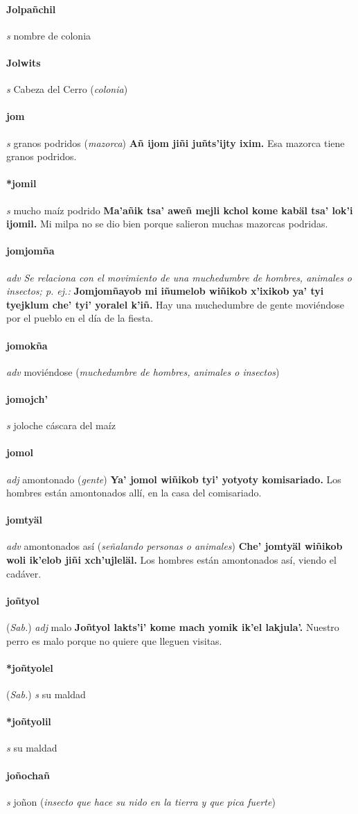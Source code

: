 \documentclass{scrbook}
\newcommand{\entry}[1]{\paragraph{#1}}
\newcommand{\nontranslationdef}[1]{\textit{#1}}
\newcommand{\partofspeech}[1]{\textit{#1}}
\newcommand{\spanishtranslation}[1]{#1}
\newcommand{\clarification}[1]{(\textit{#1})}
\newcommand{\cholexample}[1]{\textbf{#1}}
\newcommand{\exampletranslation}[1]{#1}
\newcommand{\relevantdialect}[1]{(\textit{#1})}
\begin{document}
\begin{multicols}{2}
\entry{Jolpañchil}
\partofspeech{s}
\spanishtranslation{nombre de colonia}

\entry{Jolwits}
\partofspeech{s}
\spanishtranslation{Cabeza del Cerro}
\clarification{colonia}

\entry{jom}
\partofspeech{s}
\spanishtranslation{granos podridos}
\clarification{mazorca}
\cholexample{Añ ijom jiñi juñts'ijty ixim.}
\exampletranslation{Esa mazorca tiene granos podridos.}

\entry{*jomil}
\partofspeech{s}
\spanishtranslation{mucho maíz podrido}
\cholexample{Ma'añik tsa' aweñ mejli kchol kome kabäl tsa' lok'i ijomil.}
\exampletranslation{Mi milpa no se dio bien porque salieron muchas mazorcas podridas.}

\entry{jomjomña}
\partofspeech{adv}
\nontranslationdef{Se relaciona con el movimiento de una muchedumbre de hombres, animales o insectos; p. ej.:}
\cholexample{Jomjomñayob mi iñumelob wiñikob x'ixikob ya' tyi tyejklum che' tyi' yoralel k'iñ.}
\exampletranslation{Hay una muchedumbre de gente moviéndose por el pueblo en el día de la fiesta.}

\entry{jomokña}
\partofspeech{adv}
\spanishtranslation{moviéndose}
\clarification{muchedumbre de hombres, animales o insectos}

\entry{jomojch'}
\partofspeech{s}
\spanishtranslation{joloche}
\spanishtranslation{cáscara del maíz}

\entry{jomol}
\partofspeech{adj}
\spanishtranslation{amontonado}
\clarification{gente}
\cholexample{Ya' jomol wiñikob tyi' yotyoty komisariado.}
\exampletranslation{Los hombres están amontonados allí, en la casa del comisariado.}

\entry{jomtyäl}
\partofspeech{adv}
\spanishtranslation{amontonados así}
\clarification{señalando personas o animales}
\cholexample{Che' jomtyäl wiñikob woli ik'elob jiñi xch'ujleläl.}
\exampletranslation{Los hombres están amontonados así, viendo el cadáver.}

\entry{joñtyol}
\relevantdialect{Sab.}
\partofspeech{adj}
\spanishtranslation{malo}
\cholexample{Joñtyol lakts'i' kome mach yomik ik'el lakjula'.}
\exampletranslation{Nuestro perro es malo porque no quiere que lleguen visitas.}

\entry{*joñtyolel}
\relevantdialect{Sab.}
\partofspeech{s}
\spanishtranslation{su maldad}

\entry{*joñtyolil}
\partofspeech{s}
\spanishtranslation{su maldad}

\entry{joñochañ}
\partofspeech{s}
\spanishtranslation{joñon}
\clarification{insecto que hace su nido en la tierra y que pica fuerte}


\end{multicols}
\end{document}
